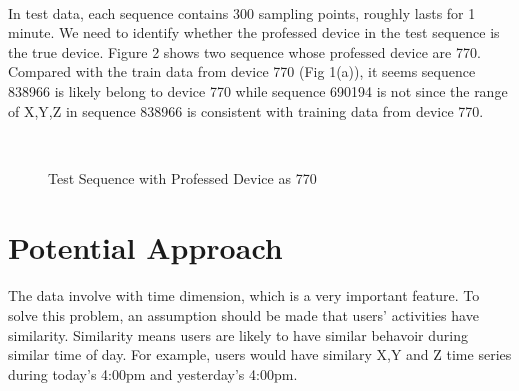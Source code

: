 \documentclass{article}
\begin{document}
	\paragraph{}In test data, each sequence contains 300 sampling points, roughly lasts for 1 minute. We need to identify whether the professed device in the test sequence is the true device. Figure 2 shows two sequence whose professed device are 770. Compared with the train data from device 770 (Fig 1(a)), it seems sequence 838966 is likely belong to device 770 while sequence 690194 is not since the range of X,Y,Z in sequence 838966 is consistent with training data from device 770. 
	\begin{figure}
		\centering
		\\
		\caption{Test Sequence with Professed Device as 770}
	\end{figure}
	
	

	\section{Potential Approach} %
	\label{sec:potential_approach}
	\paragraph{}The data involve with time dimension, which is a very important feature. To solve this problem, an assumption should be made that users' activities have similarity. Similarity means users are likely to have similar behavoir during similar time of day. For example, users would have similary X,Y and Z time series during today's 4:00pm and yesterday's 4:00pm. 
\end{document}

